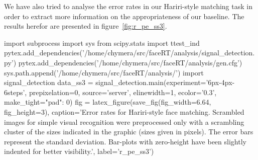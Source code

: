	    We have also tried to analyse the error rates in our Hariri-style matching task in order to extract more information on the appropriateness of our baseline.
	    The results herefor are presented in figure~\ref{fig:r_pe_ss3}.
	    \begin{pycode}
		import subprocess
		import sys
		from scipy.stats import ttest_ind
		pytex.add_dependencies('/home/chymera/src/faceRT/analysis/signal_detection.py')
		pytex.add_dependencies('/home/chymera/src/faceRT/analysis/gen.cfg')
		sys.path.append('/home/chymera/src/faceRT/analysis/')
		import signal_detection
		data_ss3 = signal_detection.main(experiment='6px-4px-6steps', prepixelation=0, source='server', elinewidth=1, ecolor='0.3', make_tight={"pad": 0})
		fig = latex_figure(save_fig(fig_width=6.64, fig_height=3), caption='Error rates for Hariri-style face matching. Scrambled images for simple visual recognition were preprocessed only with a scrambling cluster of the sizes indicated in the graphic (sizes given in pixels). The error bars represent the standard deviation. Bar-plots with zero-height have been slightly indented for better visibility.', label='r_pe_ss3')
	    \end{pycode}
	    
